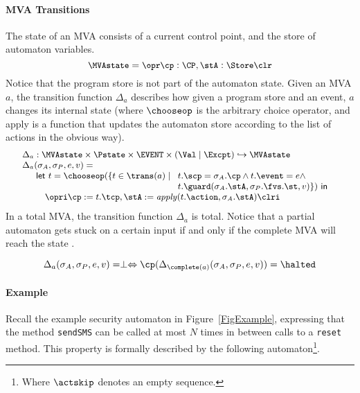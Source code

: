 \paragraph{MVA Transitions} The state of an MVA consists of a current control
point, and the store of automaton variables.
\[{\small
\MVAstate = \opr \cp : \CP, \stA : \Store \clr}
\]
Notice that the program store is not part of the automaton
state. Given an MVA \(a\), the transition function \(\Delta_a\)
describes how given a program store and an event, \(a\) changes its
internal state (where \(\chooseop\) is the arbitrary choice operator,
and \textsf{apply} is a function that updates the automaton store
according to the list of actions in the obvious way).
\[{\small
\begin{array}{l}
\Delta_a  :  \MVAstate \times \Pstate \times \EVENT \times (\Val \mid
\Excpt) \hookrightarrow
\MVAstate\\
\Delta_a(\sigma_A, \sigma_P, e, v) = \\
\quad
\begin{array}[t]{l}
\mathsf{let\ }t = \chooseop(\{t\in \trans(a)\mid
  \begin{array}[t]{l}
     t.\scp = \sigma_A.\cp \wedge t.\event = e \wedge \\
     t.\guard(\sigma_A.\stA, \sigma_P.\fvs.\st, v)\}) \mathsf{\ in}
  \end{array}\\
\quad \opri \cp := t.\tcp, \stA := \mathit{apply}(t.\action,
\sigma_A.\stA) \clri
\end{array}

\end{array}}
\]
In a total MVA, the transition function \(\Delta_a\) is total. Notice
that a partial automaton gets stuck on a certain input if and only if the
complete MVA will reach the state \halted.

\begin{equation}\label{MVAcompletionProp}
\Delta_a(\sigma_A, \sigma_P, e, v) = \perp \Leftrightarrow
\cp (\Delta_{\complete(a)}(\sigma_A, \sigma_P, e, v)) = \halted
\end{equation}


\paragraph{Example}
Recall the example security automaton in Figure~\ref{FigExample},
expressing that the method \texttt{sendSMS} can
be called at most \(N\) times in between calls to a \texttt{reset}
method. This property is formally described by the following
automaton\footnote{Where \(\actskip\) denotes an empty sequence.}.

